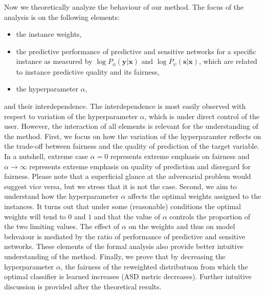 \documentclass[preprint,12pt]{elsarticle}
\begin{document}
Now we theoretically analyze the behaviour of our method. The focus of the analysis is on the following elements:
\begin{itemize}
	\item the instance weights,
	\item the predictive performance of predictive and sensitive networks for a specific instance as measured by $\log P_{\phi}(\mathbf{y}|\mathbf{x})$ and $\log P_{\psi}(\mathbf{s}|\mathbf{x})$, which are related to instance predictive quality and its fairness,
	\item the hyperparameter $\alpha$, 
\end{itemize}
and their interdependence. The interdependence is most easily observed with respect to variation of the hyperparameter $\alpha$, which is under direct control of the user. However, the interaction of all elements is relevant for the understanding of the method. First, we focus on how the variation of the hyperparamter reflects on the trade-off between fairness and the quality of prediction of the target variable. In a nutshell, extreme case $\alpha=0$ represents extreme emphasis on fairness and $\alpha\rightarrow\infty$ represents extreme emphasis on quality of prediction and disregard for fairness. Please note that a superficial glance at the adversarial problem would suggest vice versa, but we stress that it is not the case. Second, we aim to understand how the hyperparameter $\alpha$ affects the optimal weights assigned to the instances. It turns out that under some (reasonable) conditions the optimal weights will tend to $0$ and $1$ and that the value of $\alpha$ controls the proportion of the two limiting values. The effect of $\alpha$ on the weights and thus on model behvaiour is mediated by the ratio of performance of predictive and sensitive networks. These elements of the formal analysis also provide better intuitive understanding of the method. Finally, we prove that by decreasing the hyperparameter $\alpha$, the fairness of the reweighted distributuon from which the optimal classifier is learned increases (ASD metric decreases). Further intuitive discussion is provided after the theoretical results.
\end{document}
